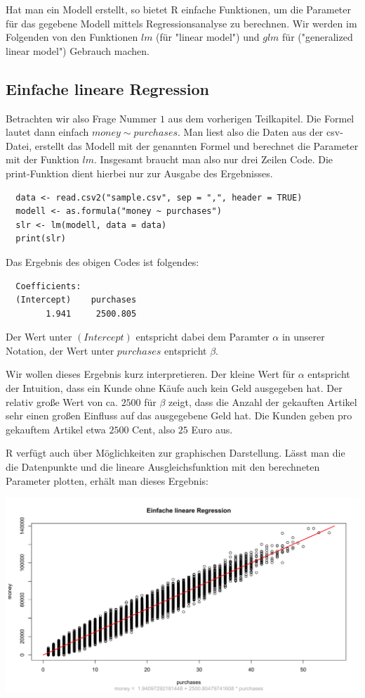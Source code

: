 Hat man ein Modell erstellt, so bietet R einfache Funktionen, um die Parameter für das gegebene Modell mittels Regressionsanalyse zu berechnen. Wir werden im Folgenden von den Funktionen $lm$ (für "linear model") und $glm$ für ("generalized linear model") Gebrauch machen.

\subsection{Einfache lineare Regression}

Betrachten wir also Frage Nummer $1$ aus dem vorherigen Teilkapitel. Die Formel lautet dann einfach $money \sim purchases$. Man liest also die Daten aus der csv-Datei, erstellt das Modell mit der genannten Formel und berechnet die Parameter mit der Funktion $lm$. Insgesamt braucht man also nur drei Zeilen Code. Die print-Funktion dient hierbei nur zur Ausgabe des Ergebnisses.

\begin{lstlisting}
  data <- read.csv2("sample.csv", sep = ",", header = TRUE)
  modell <- as.formula("money ~ purchases")
  slr <- lm(modell, data = data)
  print(slr)
\end{lstlisting}

Das Ergebnis des obigen Codes ist folgendes:

\begin{lstlisting}
  Coefficients:
  (Intercept)    purchases
        1.941     2500.805
\end{lstlisting}

Der Wert unter $(Intercept)$ entspricht dabei dem Paramter $\alpha$ in unserer Notation, der Wert unter $purchases$ entspricht $\beta$.

Wir wollen dieses Ergebnis kurz interpretieren. Der kleine Wert für $\alpha$ entspricht der Intuition, dass ein Kunde ohne Käufe auch kein Geld ausgegeben hat. Der relativ große Wert von ca. $2500$ für $\beta$ zeigt, dass die Anzahl der gekauften Artikel sehr einen großen Einfluss auf das ausgegebene Geld hat. Die Kunden geben pro gekauftem Artikel etwa $2500$ Cent, also $25$ Euro aus.

R verfügt auch über Möglichkeiten zur graphischen Darstellung. Lässt man die die Datenpunkte und die lineare Ausgleichsfunktion mit den berechneten Parameter plotten, erhält man dieses Ergebnis:

\includegraphics[width=\textwidth]{r-simpleLinearRegression}

